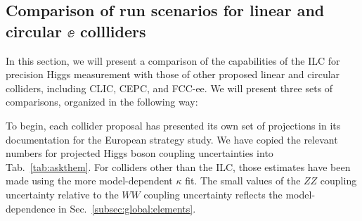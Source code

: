 

\subsection{Comparison of run scenarios for linear and circular $\ee$ collliders}
\label{subsec:lincirc}



In this section, we will present a comparison of the capabilities of
the ILC for precision Higgs measurement with those of other proposed
linear and circular colliders, including CLIC, CEPC, and FCC-ee.  We
will present three  sets of comparisons, organized in the 
following way:

To begin, each collider proposal has presented its own set of
projections in its documentation for the European strategy study.   We
have copied the relevant numbers for projected Higgs boson coupling
uncertainties into Tab.~\ref{tab:askthem}. 
For colliders other than the ILC, those estimates have been 
 made using the more model-dependent
 $\kappa$ fit.   The small values of the $ZZ$ coupling uncertainty
 relative to the
 $WW$ coupling uncertainty reflects the model-dependence in Sec.~\ref{subsec:global:elements}.


